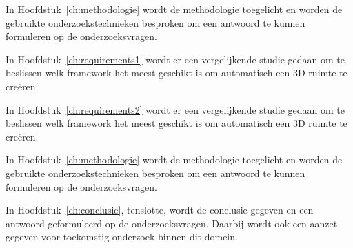In Hoofdstuk~\ref{ch:methodologie} wordt de methodologie toegelicht en worden de gebruikte onderzoekstechnieken besproken om een antwoord te kunnen formuleren op de onderzoeksvragen.


In Hoofdstuk~\ref{ch:requirements1} wordt er een vergelijkende studie gedaan om te beslissen welk framework het meest geschikt is om automatisch een 3D ruimte te creëren.

In Hoofdstuk~\ref{ch:requirements2} wordt er een vergelijkende studie gedaan om te beslissen welk framework het meest geschikt is om automatisch een 3D ruimte te creëren.


In Hoofdstuk~\ref{ch:methodologie} wordt de methodologie toegelicht en worden de gebruikte onderzoekstechnieken besproken om een antwoord te kunnen formuleren op de onderzoeksvragen.


In Hoofdstuk~\ref{ch:conclusie}, tenslotte, wordt de conclusie gegeven en een antwoord geformuleerd op de onderzoeksvragen. Daarbij wordt ook een aanzet gegeven voor toekomstig onderzoek binnen dit domein.